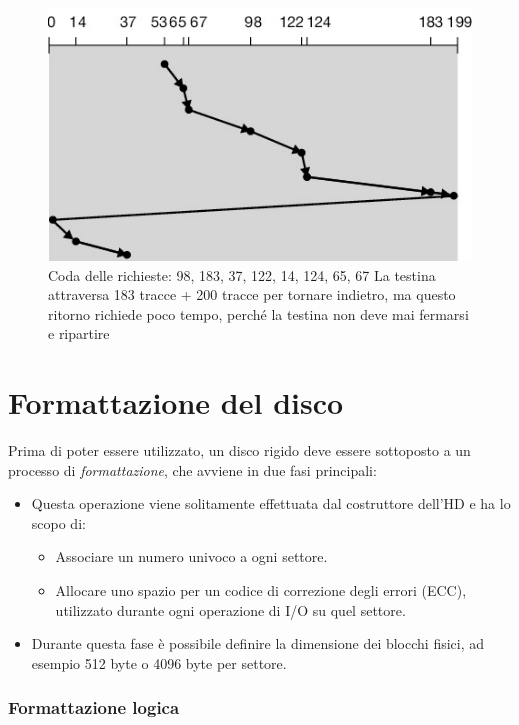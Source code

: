\begin{figure}[h] \centering \includegraphics[width=0.25\linewidth]{Teoria/images/scheduling_hdd_cscan.png}
    \caption{Coda delle richieste: 98, 183, 37, 122, 14, 124, 65, 67 La testina attraversa 183 tracce + 200 tracce per tornare indietro, ma questo ritorno richiede poco tempo, perché la
    testina non deve mai fermarsi e ripartire}
\end{figure}



\section{Formattazione del disco}
Prima di poter essere utilizzato, un disco rigido deve essere sottoposto a un processo di \textit{formattazione}, che avviene in due fasi principali:

\begin{itemize}
    \item Questa operazione viene solitamente effettuata dal costruttore dell’HD e ha lo scopo di:
    \begin{itemize}
        \item Associare un numero univoco a ogni settore.
        \item Allocare uno spazio per un codice di correzione degli errori (ECC), utilizzato durante ogni operazione di I/O su quel settore.
    \end{itemize}
    \item Durante questa fase è possibile definire la dimensione dei blocchi fisici, ad esempio 512 byte o 4096 byte per settore.
\end{itemize}

\subsubsection{Formattazione logica}

